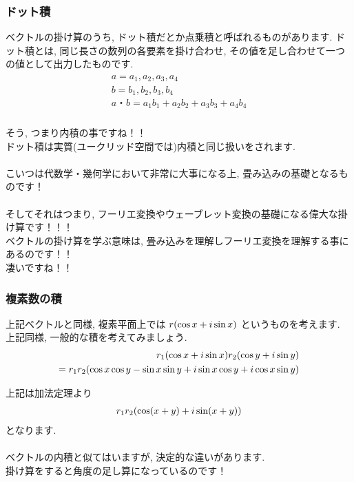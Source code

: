 \documentclass[11pt,a4paper]{jsarticle}
\begin{document}
\subsubsection{ドット積}
ベクトルの掛け算のうち, ドット積だとか点乗積と呼ばれるものがあります.
ドット積とは, 同じ長さの数列の各要素を掛け合わせ, その値を足し合わせて一つの値として出力したものです.\\
\begin{eqnarray}
\begin{split}
a = {a_1,a_2,a_3,a_4}\\
b={b_1,b_2,b_3,b_4}\\
a・b = a_1b_1 + a_2b_2 + a_3b_3 + a_4b_4
\end{split}
\end{eqnarray}
\\
そう, つまり内積の事ですね！！\\
ドット積は実質(ユークリッド空間では)内積と同じ扱いをされます.\\
\\
こいつは代数学・幾何学において非常に大事になる上, 畳み込みの基礎となるものです！\\
\\
そしてそれはつまり, フーリエ変換やウェーブレット変換の基礎になる偉大な掛け算です！！！
\\
ベクトルの掛け算を学ぶ意味は, 畳み込みを理解しフーリエ変換を理解する事にあるのです！！\\
凄いですね！！\\

\subsubsection{複素数の積}
上記ベクトルと同様, 複素平面上では $\mathstrut r (\cos x + \mathstrut i\sin x)$ というものを考えます.\\
上記同様, 一般的な積を考えてみましょう.\\

\begin{eqnarray}
\begin{split}
\mathstrut r_1(\cos x + \mathstrut i\sin x)\mathstrut r_2(\cos y + \mathstrut i\sin y)\\
= \mathstrut r_1\mathstrut r_2(\cos x\cos y - \sin x\sin y + \mathstrut i\sin x \cos y + \mathstrut i\cos x\sin y)
\end{split}
\end{eqnarray}

上記は加法定理より
\begin{eqnarray}
\mathstrut r_1\mathstrut r_2(\cos (\mathstrut x + \mathstrut y) + \mathstrut i\sin (\mathstrut x + \mathstrut y))
\end{eqnarray}
となります.\\
\\
ベクトルの内積と似てはいますが, 決定的な違いがあります.\\
掛け算をすると角度の足し算になっているのです！\\
\end{document}
